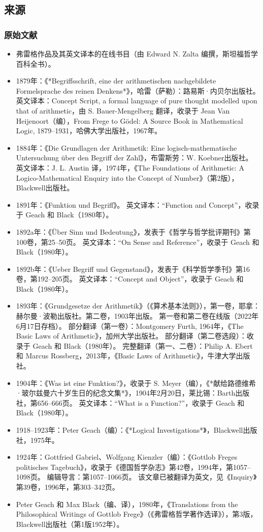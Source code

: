 \subsection{来源}  
\subsubsection{原始文献}  
\begin{itemize}
\item 弗雷格作品及其英文译本的在线书目（由 Edward N. Zalta 编撰，斯坦福哲学百科全书）。  
\item 1879年：《*Begriffsschrift, eine der arithmetischen nachgebildete Formelsprache des reinen Denkens*》，哈雷（萨勒）：路易斯·内贝尔出版社。  
  英文译本：Concept Script, a formal language of pure thought modelled upon that of arithmetic，由 S. Bauer-Mengelberg 翻译，收录于 Jean Van Heijenoort（编），From Frege to Gödel: A Source Book in Mathematical Logic, 1879–1931，哈佛大学出版社，1967年。  
\item 1884年：《Die Grundlagen der Arithmetik: Eine logisch-mathematische Untersuchung über den Begriff der Zahl》，布雷斯劳：W. Koebner出版社。  
  英文译本：J. L. Austin 译，1974年，《The Foundations of Arithmetic: A Logico-Mathematical Enquiry into the Concept of Number》（第2版），Blackwell出版社。  
\item 1891年：《Funktion und Begriff》。  
  英文译本：“Function and Concept”，收录于 Geach 和 Black（1980年）。  
\item 1892a年：《Über Sinn und Bedeutung》，发表于《哲学与哲学批评期刊》第100卷，第25–50页。  
  英文译本：“On Sense and Reference”，收录于 Geach 和 Black（1980年）。  
\item 1892b年：《Ueber Begriff und Gegenstand》，发表于《科学哲学季刊》第16卷，第192–205页。  
  英文译本：“Concept and Object”，收录于 Geach 和 Black（1980年）。
\item 1893年：《Grundgesetze der Arithmetik》（《算术基本法则》），第一卷，耶拿：赫尔曼·波勒出版社。第二卷，1903年出版。  
  第一卷和第二卷在线版（2022年6月17日存档）。  
  部分翻译（第一卷）：Montgomery Furth, 1964年，《The Basic Laws of Arithmetic》，加州大学出版社。  
  部分翻译（第二卷选段）：收录于 Geach 和 Black（1980年）。  
  完整翻译（第一、二卷）：Philip A. Ebert 和 Marcus Rossberg，2013年，《Basic Laws of Arithmetic》，牛津大学出版社。  
\item 1904年：《Was ist eine Funktion?》，收录于 S. Meyer（编），《*献给路德维希·玻尔兹曼六十岁生日的纪念文集*》，1904年2月20日，莱比锡：Barth出版社，第656–666页。  
  英文译本：“What is a Function?”，收录于 Geach 和 Black（1980年）。  
\item 1918–1923年：Peter Geach（编）：《*Logical Investigations*》，Blackwell出版社，1975年。  
\item 1924年：Gottfried Gabriel、Wolfgang Kienzler（编）：《Gottlob Freges politisches Tagebuch》，收录于《德国哲学杂志》第42卷，1994年，第1057–1098页。  
  编辑导言：第1057–1066页。  
  该文章已被翻译为英文，见《Inquiry》第39卷，1996年，第303–342页。  
\item Peter Geach 和 Max Black（编、译），1980年，《Translations from the Philosophical Writings of Gottlob Frege》（《弗雷格哲学著作选译》），第3版，Blackwell出版社（第1版1952年）。
\end{itemize}

